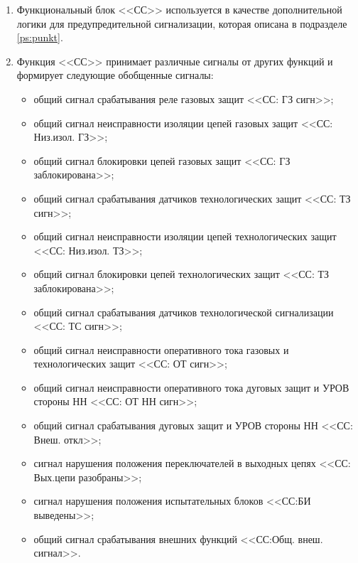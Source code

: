 \documentclass[a4paper, 12pt,table, hidelinks, DIV=calc]{extarticle} %
\begin{document}
\color{black}

\begin{enumerate}[label=\arabic{section}.\arabic{subsection}.\arabic*, labelsep=4pt, leftmargin=0pt, itemindent=57pt]

\item
Функциональный блок <<СС>> используется в качестве дополнительной логики для предупредительной сигнализации, которая описана в подразделе \ref{ps:punkt}.
\item
Функция <<СС>>  принимает различные сигналы от других функций и формирует следующие обобщенные сигналы:
\begin{itemize}
	\item общий сигнал срабатывания реле газовых защит <<СС: ГЗ сигн>>;
	\item общий сигнал неисправности изоляции цепей газовых защит <<СС: Низ.изол. ГЗ>>;
	\item общий сигнал блокировки цепей газовых защит <<СС: ГЗ заблокирована>>;
	\item общий сигнал срабатывания датчиков технологических защит <<СС: ТЗ сигн>>;
	\item общий сигнал неисправности изоляции цепей технологических защит <<СС: Низ.изол. ТЗ>>;
	\item общий сигнал блокировки цепей технологических защит <<СС: ТЗ заблокирована>>;	
	\item общий сигнал срабатывания датчиков технологической сигнализации <<СС: ТС сигн>>;
	\item общий сигнал неисправности оперативного тока газовых и технологических защит <<СС: ОТ сигн>>;	
	\item общий сигнал неисправности оперативного тока дуговых защит и УРОВ стороны НН <<СС: ОТ НН сигн>>;
	\item общий сигнал срабатывания дуговых защит и УРОВ стороны НН <<СС: Внеш. откл>>;
	\item сигнал нарушения положения переключателей в выходных цепях  <<СС: Вых.цепи разобраны>>;
	\item сигнал нарушения положения испытательных блоков <<СС:БИ выведены>>;
	\item общий сигнал срабатывания внешних функций <<СС:Общ. внеш. сигнал>>.	
\end{itemize}


\end{enumerate}
\end{document}
